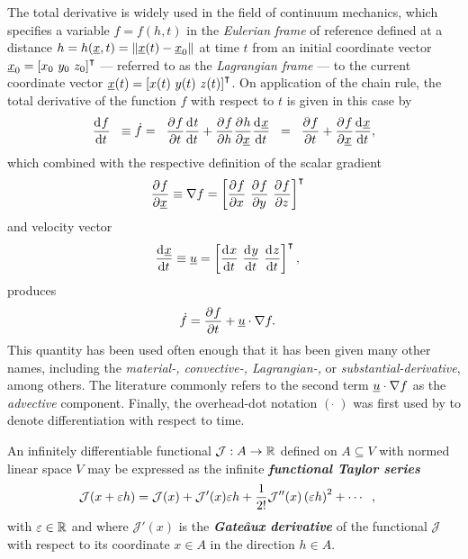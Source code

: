 The total derivative is widely used in the field of continuum mechanics, which specifies a variable $f = f(h,t)$ in the \emph{Eulerian frame} of reference defined at a distance $h = h(\underline{x}, t) = \Vert \underline{x}(t) - \underline{x}_0 \Vert$ at time $t$ from an initial coordinate vector $\underline{x}_0 = \left[ x_0\ y_0\ z_0 \right]^\intercal$ --- referred to as the \emph{Lagrangian frame} --- to the current coordinate vector $\underline{x}(t) = \left[ x(t)\ y(t)\ z(t) \right]^\intercal$.
On application of the chain rule, the total derivative of the function $f$ with respect to $t$ is given in this case by
\begin{align*}
  \frac{\mathrm{d}{^{}} f}{\mathrm{d} t{^{}} } \hspace{2mm} \equiv \dot{f} = \hspace{2mm} \frac{\partial{^{}} f}{\partial t{^{}} } \frac{\mathrm{d}{^{}} t}{\mathrm{d} t{^{}} } + \frac{\partial{^{}} f}{\partial h{^{}} } \frac{\partial{^{}} h}{\partial \underline{x}{^{}} } \frac{\mathrm{d}{^{}} \underline{x}}{\mathrm{d} t{^{}} }
  \hspace{2mm} = \hspace{2mm} \frac{\partial{^{}} f}{\partial t{^{}} } + \frac{\partial{^{}} f}{\partial \underline{x}{^{}} } \frac{\mathrm{d}{^{}} \underline{x}}{\mathrm{d} t{^{}} },
\end{align*}
which combined with the respective definition of the scalar gradient
\begin{align}
  \label{gradient}
  \parder{f}{\rankone{x}} &\equiv \nabla f = \left[ \parder{f}{x}\ \parder{f}{y}\ \parder{f}{z} \right]\T
\end{align}
and velocity vector
\begin{align}
  \label{velocity}
  \frac{\mathrm{d}{^{}} \underline{x}}{\mathrm{d} t{^{}} } &\equiv \underline{u} = \left[ \frac{\mathrm{d}{^{}} x}{\mathrm{d} t{^{}} }\ \frac{\mathrm{d}{^{}} y}{\mathrm{d} t{^{}} }\ \frac{\mathrm{d}{^{}} z}{\mathrm{d} t{^{}} } \right]^\intercal,
\end{align}
produces
\begin{align}
  \label{material_derivative}
  \dot{f} &= \frac{\partial{^{}} f}{\partial t{^{}} } + \underline{u} \cdot \nabla f.
\end{align}
This quantity has been used often enough that it has been given many other names, including the \emph{material-, convective-, Lagrangian-,} or \emph{substantial-derivative}, among others.
The literature commonly refers to the second term $\underline{u} \cdot \nabla f$ as the \emph{advective} component.
Finally, the overhead-dot notation $(\ \dot{ }\ )$ was first used by \citet{newton_1704} to denote differentiation with respect to time.

\begin{corollary}
\label{functional_taylors_theorem}
An infinitely differentiable functional $\mathcal{J} : A \rightarrow \mathbb{R}$ defined on $A \subseteq V$ with normed linear space $V$ may be expressed as the infinite \textbf{\emph{functional Taylor series}}
\begin{align}
  \label{functional_taylor_series}
  \mathcal{J}(x + \varepsilon h) &= \mathcal{J}(x) + \mathcal{J}'(x) \varepsilon h + \frac{1}{2!} \mathcal{J}''(x) \left( \varepsilon h \right)^2 + \cdots \hspace{2mm},
\end{align}
with $\varepsilon \in \mathbb{R}$ and where $\mathcal{J}'(x)$ is the \textbf{\emph{Gate\^{a}ux derivative}} of the functional $\mathcal{J}$ with respect to its coordinate $x \in A$ in the direction $h \in A$.
\end{corollary}

